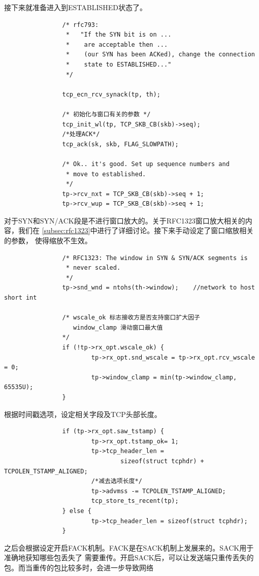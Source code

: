 接下来就准备进入到ESTABLISHED状态了。
\begin{verbatim}
                /* rfc793:
                 *   "If the SYN bit is on ...
                 *    are acceptable then ...
                 *    (our SYN has been ACKed), change the connection
                 *    state to ESTABLISHED..."
                 */

                tcp_ecn_rcv_synack(tp, th);

                /* 初始化与窗口有关的参数 */
                tcp_init_wl(tp, TCP_SKB_CB(skb)->seq);
				/*处理ACK*/
                tcp_ack(sk, skb, FLAG_SLOWPATH);

                /* Ok.. it's good. Set up sequence numbers and
                 * move to established.
                 */
                tp->rcv_nxt = TCP_SKB_CB(skb)->seq + 1;
                tp->rcv_wup = TCP_SKB_CB(skb)->seq + 1;
\end{verbatim}
对于SYN和SYN/ACK段是不进行窗口放大的。关于RFC1323窗口放大相关的内容，我们在
\ref{subsec:rfc1323}中进行了详细讨论。接下来手动设定了窗口缩放相关的参数，
使得缩放不生效。
\begin{verbatim}
                /* RFC1323: The window in SYN & SYN/ACK segments is
                 * never scaled.
                 */
                tp->snd_wnd = ntohs(th->window);    //network to host short int

                /* wscale_ok 标志接收方是否支持窗口扩大因子
                   window_clamp 滑动窗口最大值
                */                
                if (!tp->rx_opt.wscale_ok) {
                        tp->rx_opt.snd_wscale = tp->rx_opt.rcv_wscale = 0;
                        tp->window_clamp = min(tp->window_clamp, 65535U);
                }
\end{verbatim}
根据时间戳选项，设定相关字段及TCP头部长度。
\begin{verbatim}
                if (tp->rx_opt.saw_tstamp) {
                        tp->rx_opt.tstamp_ok= 1;
                        tp->tcp_header_len =
                                sizeof(struct tcphdr) + TCPOLEN_TSTAMP_ALIGNED;
						/*减去选项长度*/                        
						tp->advmss -= TCPOLEN_TSTAMP_ALIGNED;
                        tcp_store_ts_recent(tp);
                } else {
                        tp->tcp_header_len = sizeof(struct tcphdr);
                }
\end{verbatim}
之后会根据设定开启FACK机制。FACK是在SACK机制上发展来的。SACK用于准确地获知哪些包丢失了
需要重传。开启SACK后，可以让发送端只重传丢失的包。而当重传的包比较多时，会进一步导致网络
